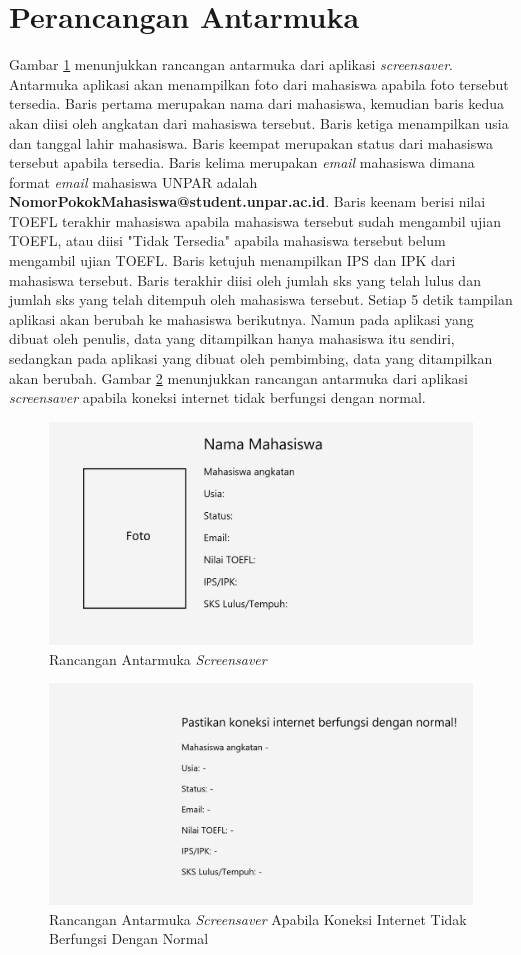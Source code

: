 \section{Perancangan Antarmuka}
Gambar \ref{fig:4_antarmuka} menunjukkan rancangan antarmuka dari aplikasi \textit{screensaver}. Antarmuka aplikasi akan menampilkan foto dari mahasiswa apabila foto tersebut tersedia. Baris pertama merupakan nama dari mahasiswa, kemudian baris kedua akan diisi oleh angkatan dari mahasiswa tersebut. Baris ketiga menampilkan usia dan tanggal lahir mahasiswa. Baris keempat merupakan status dari mahasiswa tersebut apabila tersedia. Baris kelima merupakan \textit{email} mahasiswa dimana format \textit{email} mahasiswa UNPAR adalah \textbf{NomorPokokMahasiswa@student.unpar.ac.id}. Baris keenam berisi nilai TOEFL terakhir mahasiswa apabila mahasiswa tersebut sudah mengambil ujian TOEFL, atau diisi "Tidak Tersedia" apabila mahasiswa tersebut belum mengambil ujian TOEFL. Baris ketujuh menampilkan IPS dan IPK dari mahasiswa tersebut. Baris terakhir diisi oleh jumlah sks yang telah lulus dan jumlah sks yang telah ditempuh oleh mahasiswa tersebut. Setiap 5 detik tampilan aplikasi akan berubah ke mahasiswa berikutnya. Namun pada aplikasi yang dibuat oleh penulis, data yang ditampilkan hanya mahasiswa itu sendiri, sedangkan pada aplikasi yang dibuat oleh pembimbing, data yang ditampilkan akan berubah. Gambar \ref{fig:4_antarmuka_error} menunjukkan rancangan antarmuka dari aplikasi \textit{screensaver} apabila koneksi internet tidak berfungsi dengan normal.

\begin{figure}[H]
	\centering
	\includegraphics[scale=0.23]{Gambar/UI2.png}
	\caption{Rancangan Antarmuka \textit{Screensaver}}
	\label{fig:4_antarmuka}
\end{figure}

\begin{figure}[H]
	\centering
	\includegraphics[scale=0.23]{Gambar/hasil3.png}
	\caption{Rancangan Antarmuka \textit{Screensaver} Apabila Koneksi Internet Tidak Berfungsi Dengan Normal}
	\label{fig:4_antarmuka_error}
\end{figure}